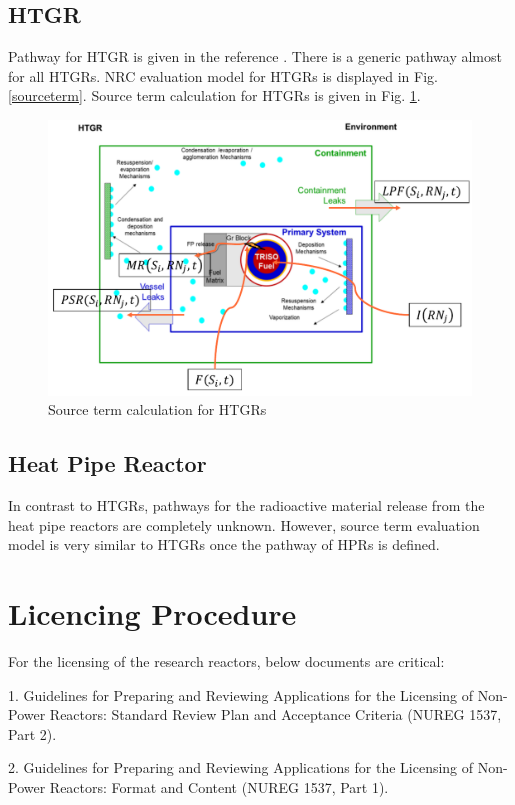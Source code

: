 \documentclass[10pt,a4paper]{article}
\begin{document}
\subsection{HTGR}
Pathway for HTGR is given in the reference  \cite{noauthor_htgr_2010}. There is a generic pathway almost for all HTGRs. NRC evaluation model for HTGRs is displayed in Fig. \ref{sourceterm}. Source term calculation for HTGRs is given in Fig.  \ref{htgrsourceterm}. 

\begin{figure}[hbtp]
\centering
\includegraphics[scale=0.5]{Figs/htgrsourceterm.jpeg}
\caption{Source term calculation for HTGRs}
\label{htgrsourceterm}
\end{figure}

\subsection{Heat Pipe Reactor}
In contrast to HTGRs, pathways for the radioactive material release from the heat pipe reactors are completely unknown. However, source term evaluation model is very similar to HTGRs once the pathway of HPRs is defined.  


\pagebreak
\section{Licencing Procedure}
For the licensing of the research reactors, below documents are critical:

1. Guidelines for Preparing and Reviewing Applications for the Licensing of Non-Power Reactors: Standard Review Plan and Acceptance Criteria (NUREG 1537, Part 2).

2. Guidelines for Preparing and Reviewing Applications for the Licensing of Non-Power Reactors: Format and Content (NUREG 1537, Part 1). 
\end{document}
